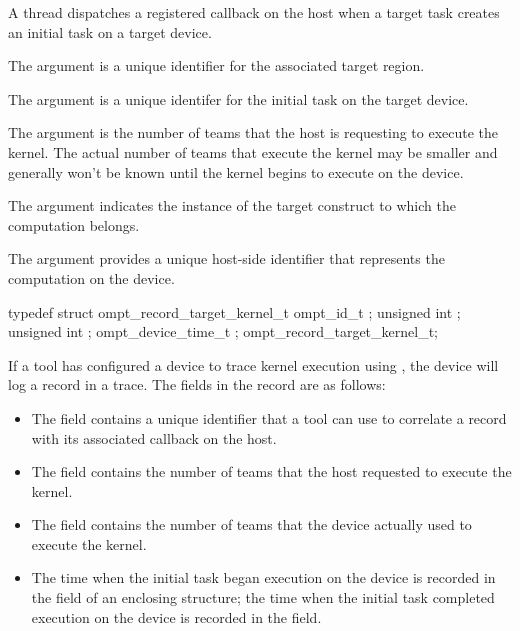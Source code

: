 \descr
A thread dispatches a registered  callback on the host when
a target task creates an initial task on a target device.

\argdesc

The argument  is a unique identifier for the
associated target region.

The argument  is a unique identifer for the
initial task on the target device.

The argument  is the number of teams that the host is requesting to
execute the kernel. The actual number of teams that execute the kernel may be smaller and generally won't be
known until the kernel begins to execute on the device.

\constraints

The argument  indicates the instance of the
target construct to which the computation belongs.

The argument  provides a unique host-side
identifier that represents the computation on the device.

\record

\begin{ccppspecific}
\begin{omptRecord}
typedef struct ompt_record_target_kernel_t {
  ompt_id_t ;
  unsigned int ;
  unsigned int ;
  ompt_device_time_t ;
} ompt_record_target_kernel_t;
\end{omptRecord}
\end{ccppspecific}



If a tool has configured a device to trace kernel execution using ,
the device will log a  record in a trace. The fields in the record
are as follows:

\begin{itemize}
\item The  field contains a unique identifier that a tool can use to correlate a
 record with its associated  callback
on the host.

\item The  field contains the number of teams that the host requested to execute the kernel.

\item The  field contains the number of teams that the device actually used to execute the kernel.

\item The time when the initial task began execution on the device is recorded in the  field of an enclosing
 structure; the time when the initial task completed execution on the device is recorded in the  field.
\end{itemize}

